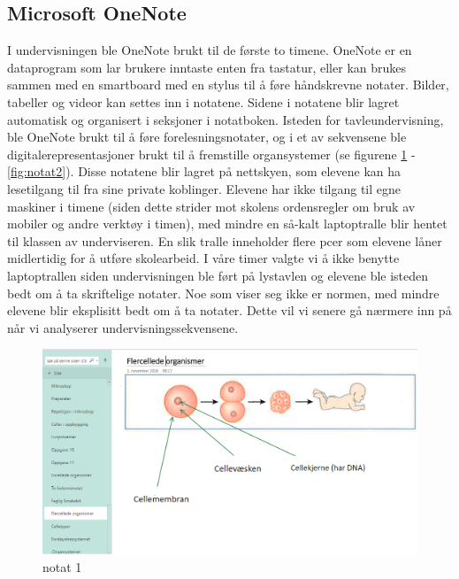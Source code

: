 \documentclass[main.tex]{subfiles}
\begin{document}
\subsection*{Microsoft OneNote}

I undervisningen ble OneNote brukt til de første to timene. OneNote er en dataprogram som lar 
brukere inntaste enten fra tastatur, eller kan brukes sammen med en smartboard med en stylus til å
føre håndskrevne notater. Bilder, tabeller og videor kan settes inn i notatene. Sidene i notatene 
blir lagret automatisk og organisert i seksjoner i notatboken. Isteden for tavleundervisning, 
ble OneNote brukt til å føre forelesningsnotater, og i et av sekvensene ble 
digitalerepresentasjoner brukt til å fremstille organsystemer (se figurene \ref{fig:notat1} -
\ref{fig:notat2}). Disse notatene blir lagret på nettskyen, som elevene kan ha lesetilgang til
fra sine private koblinger. Elevene har ikke tilgang til egne maskiner i timene (siden dette 
strider mot skolens ordensregler om bruk av mobiler og andre verktøy i timen), med mindre en 
så-kalt laptoptralle blir hentet til klassen av underviseren. En slik tralle inneholder flere 
pcer som elevene låner midlertidig for å utføre skolearbeid. I våre timer valgte vi å ikke 
benytte laptoptrallen siden undervisningen ble ført på lystavlen og elevene ble isteden bedt 
om å ta skriftelige notater. Noe som viser seg ikke er normen, med mindre elevene blir 
eksplisitt bedt om å ta notater. Dette vil vi senere gå nærmere inn på når vi analyserer 
undervisningssekvensene.

\begin{figure}[h!]
\includegraphics[scale = 0.6]{../figures/onenote_flercellet.png}
\caption{notat 1}
\label{fig:notat1}
\end{figure}
\end{document}
